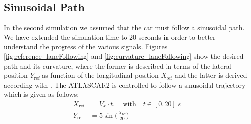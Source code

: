 \subsection{Sinusoidal Path}
In the second simulation we assumed that the car must follow a sinusoidal path. We have extended the simulation time to 20 seconds in order to better understand the progress of the various signals. Figures \ref{fig:reference_laneFollowing} and \ref{fig:curvature_laneFollowing} show the desired path and its curvature, where the former is described in terms of the lateral position $Y_{\text{ref}}$ as function of the longitudinal position $X_{\text{ref}}$ and the latter is derived according with \cite{curvature}. The ATLASCAR2 is controlled to follow a sinusoidal trajectory which is given as follows:
\begin{equation}
\begin{aligned}
X_\text{ref}&=V_x\cdot t,\quad \text{with}\quad t\in[0,20]\SI{}{s}\\
Y_\text{ref}&=\displaystyle 5\sin\Big(\frac{X_\text{ref}}{20}\Big) 
\end{aligned}
\end{equation}
